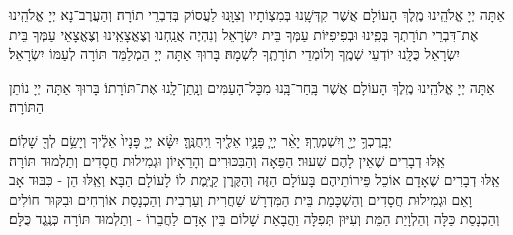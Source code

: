 \documentclass[twoside, openany, parskip=half, 11pt]{book}
\begin{document}
אַתָּה יְיָ אֱלֹהֵֽינוּ מֶֽלֶךְ הָעוֹלָם אֲשֶׁר קִדְּשָֽׁנוּ בְּמִצְוֹתָיו וְצִוָּֽנוּ לַעֲסוֹק בְּדִבְרֵי תוֹרָה׃ וְהַעֲרֶב־נָא יְיָ אֱלֹהֵֽינוּ אֶת־דִּבְרֵי תוֹרָתְךָ בְּפִֽינוּ וּבְפִיפִיּוֹת עַמְּךָ בֵּית יִשְׂרָאֵל וְנִהְיֶה אֲנַֽחְנוּ וְצֶאֱצָאֵֽינוּ וְצֶאֱצָאֵי עַמְּךָ בֵּית יִשְׂרָאֵל כֻּלָּֽנוּ יוֹדְעֵי שְׁמֶֽךָ וְלוֹמְדֵי תוֹרָתֶֽךָ לִשְׁמָהּ׃ בָּרוּךְ אַתָּה יְיָ הַמְלַמֵּד תּוֹרָה לְעַמּוֹ יִשְׂרָאֵל׃

אַתָּה יְיָ אֱלֹהֵֽינוּ מֶֽלֶךְ הָעוֹלָם אֲשֶׁר בָּֽחַר־בָּֽנוּ מִכׇּל־הָעַמִּים וְנָֽתַן־לָֽנוּ אֶת־תּוֹרָתוֹ׃ בָּרוּךְ אַתָּה יְיָ נוֹתֵן הַתּוֹרָה׃



יְבָֽרֶכְךָ֥ יְיָ֖ וְיִשְׁמְרֶֽךָ׃ יָאֵ֨ר יְיָ֧ פָּנָ֛יו אֵלֶ֖יךָ וִֽיחֻנֶּֽךָּ׃ יִשָּׂ֨א יְיָ֤ פָּנָיו֙ אֵלֶ֔יךָ וְיָשֵׂ֥ם לְךָ֖ שָׁלֽוֹם׃\\
אֵֽלּוּ דְבָרִים שֶׁאֵין לָהֶם שִׁעוּר׃ הַפֵּאָה וְהַבִּכּוּרִים וְהָרֵאָיוֹן וּגְמִילוּת חֲסָדִים וְתַלְמוּד תּוֹרָה׃\\
אֵֽלּוּ דְבָרִים שֶׁאָדָם אוֹכֵל פֵּירוֹתֵיהֶם בָּעוֹלָם הַזֶּה וְהַקֶּֽרֶן קַיֶּֽמֶת לוֹ לָעוֹלָם הַבָּא׃ וְאֵֽלּוּ הֵן - כִּבּוּד אָב וָאֵם וּגְמִילוּת חֲסָדִים וְהַשְׁכָּמַת בֵּית הַמִּדְרָשׁ שַׁחֲרִית וְעַרְבִית וְהַכְנָסַת אוֹרְחִים וּבִקּוּר חוֹלִים וְהַכְנָסַת כַּלָּה וְהַלְוָיַת הַמֵּת וְעִיּוּן תְּפִלָּה וַהֲבָאַת שָׁלוֹם בֵּין אָדָם לַחֲבֵרוֹ - וְתַלְמוּד תּוֹרָה כְּנֶֽגֶד כֻּלָּם׃




\newcommand{\adonolam}{

\firstword{אֲדוֹן עוֹלָם}
אֲשֶׁר מָלַךְ \hfill בְּטֶֽרֶם כׇּל־יְצִיר נִבְרָא׃ \\
לְעֵת נַעֲשָׂה בְחֶפְצוֹ כֹּל \hfill אֲזַי מֶֽלֶךְ שְׁמוֹ נִקְרָא׃\\
וְאַֽחֲרֵי כִּכְלוֹת הַכֹּל \hfill לְבַדּוֹ יִמְלֹךְ נוֹרָא׃ \\
וְהוּא הָיָה וְהוּא הוֶֹה \hfill וְהוּא יִהְיֶה בְּתִפְאָרָה׃ \\
וְהוּא אֶחָד וְאֵין שֵׁנִי \hfill לְהַמְשִׁיל לוֹ לְהַחְבִּֽירָה׃ \\
בְּלִי רֵאשִׁית בְּלִי תַכְלִית \hfill וְלוֹ הָעֹז וְהַמִּשְׂרָה׃ \\
וְהוּא אֵלִי וְחַי גוֹאֲלִי \hfill וְצוּר חֶבְלִי בְּעֵת צָרָה׃ \\
וְהוּא נִסִּי וּמָנוֹסִי \hfill מְנָת כּוֹסִי בְּיוֹם אֶקְרָא׃ \\
בְּיָדוֹ אַפְקִיד רוּחִי \hfill בְּעֵת אִישַׁן וְאָעִֽירָה׃ \\
וְעִם רוּחִי גְּוִיָּתִי \hfill אֲדוֹנָי לִי וְלֹא אִירָא׃
}
\end{document}
